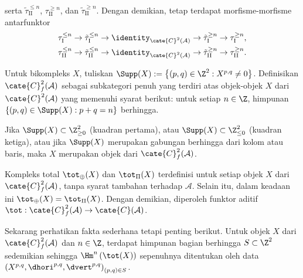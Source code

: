 serta $\tilde{\tau}_{\mathrm{II}}^{\leq n}$,
$\tau_{\mathrm{II}}^{\geq n}$, dan
$\tilde{\tau}_{\mathrm{II}}^{\geq n}$. Dengan demikian, tetap terdapat
morfisme-morfisme antarfunktor
\begin{gather*}
	\tau_{\mathrm{I}}^{\leq n} \to \tilde{\tau}_{\mathrm{I}}^{\leq n} \to \identity_{\cate{C}^2(\mathcal{A})} \to \tilde{\tau}_{\mathrm{I}}^{\geq n} \to \tau_{\mathrm{I}}^{\geq n}, \\
	\tau_{\mathrm{II}}^{\leq n} \to \tilde{\tau}_{\mathrm{II}}^{\leq n} \to \identity_{\cate{C}^2(\mathcal{A})} \to \tilde{\tau}_{\mathrm{II}}^{\geq n} \to \tau_{\mathrm{II}}^{\geq n}.
\end{gather*}

\begin{definisi}\label{def:Cf-Supp}
	Untuk bikompleks $X$, tuliskan
	$\Supp(X) := \left\{ (p,q) \in \Z^2 : X^{p,q} \neq 0 \right\}$.
	Definisikan $\cate{C}^2_f(\mathcal{A})$ sebagai subkategori penuh yang
	terdiri atas objek-objek $X$ dari $\cate{C}^2(\mathcal{A})$ yang memenuhi
	syarat berikut: untuk setiap $n \in \Z$, himpunan
	$\{ (p, q) \in \Supp(X): p + q = n \}$ berhingga.
\end{definisi}

\begin{contoh}
	Jika $\Supp(X) \subset \Z_{\geq 0}^2$ (kuadran pertama), atau
	$\Supp(X) \subset \Z_{\leq 0}^2$ (kuadran ketiga), atau jika $\Supp(X)$
	merupakan gabungan berhingga dari kolom atau baris, maka $X$ merupakan
	objek dari $\cate{C}^2_f(\mathcal{A})$.
\end{contoh}

Kompleks total $\tot_{\oplus}(X)$ dan $\tot_{\Pi}(X)$ terdefinisi untuk
setiap objek $X$ dari $\cate{C}^2_f(\mathcal{A})$, tanpa syarat tambahan
terhadap $\mathcal{A}$. Selain itu, dalam keadaan ini
$\tot_{\oplus}(X) = \tot_{\Pi}(X)$. Dengan demikian, diperoleh funktor aditif
$\tot: \cate{C}^2_f(\mathcal{A}) \to \cate{C}(\mathcal{A})$.

Sekarang perhatikan fakta sederhana tetapi penting berikut. Untuk objek $X$ dari
$\cate{C}^2_f(\mathcal{A})$ dan $n \in \Z$, terdapat himpunan bagian
berhingga $S \subset \Z^2$ sedemikian sehingga
$\Hm^n\left( \tot(X) \right)$ sepenuhnya ditentukan oleh data
$\left( X^{p,q}, \dhori^{p, q} , \dvert^{p,q} \right)_{(p, q) \in S}$.

